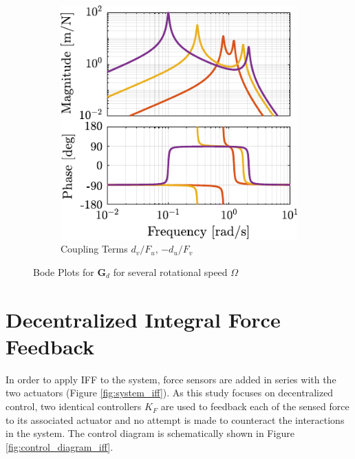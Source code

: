 \documentclass{ISMA_USD2020}
\begin{document}
\begin{figure}[htbp]
\begin{subfigure}[c]{0.45\linewidth}
\includegraphics[width=\linewidth]{figs/plant_compare_rotating_speed_coupling.pdf}
\caption{\label{fig:plant_compare_rotating_speed_coupling} Coupling Terms \(d_v/F_u\), \(-d_u/F_v\)}
\end{subfigure}
\hfill
\caption{\label{fig:plant_compare_rotating_speed}Bode Plots for \(\bm{G}_d\) for several rotational speed \(\Omega\)}
\centering
\end{figure}

\section{Decentralized Integral Force Feedback}
\label{sec:org69e5bf1}
\label{sec:iff}
In order to apply IFF to the system, force sensors are added in series with the two actuators (Figure \ref{fig:system_iff}).
As this study focuses on decentralized control, two identical controllers \(K_F\) are used to feedback each of the sensed force to its associated actuator and no attempt is made to counteract the interactions in the system.
The control diagram is schematically shown in Figure \ref{fig:control_diagram_iff}.
\end{document}
